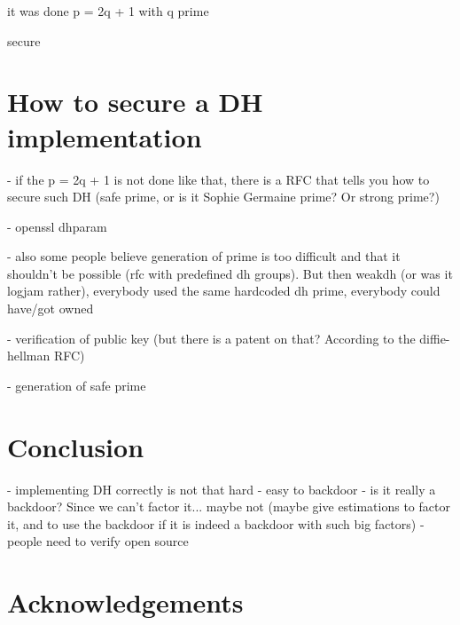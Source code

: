 \documentclass[a4paper,11pt]{article}
\begin{document}
it was done p = 2q + 1 with q prime

secure

\section{How to secure a DH implementation}

- if the p = 2q + 1 is not done like that, there is a RFC that tells you how to secure such DH (safe prime, or is it Sophie Germaine prime? Or strong prime?)

- openssl dhparam

- also some people believe generation of prime is too difficult and that it shouldn't be possible (rfc with predefined dh groups). But then weakdh (or was it logjam rather), everybody used the same hardcoded dh prime, everybody could have/got owned

- verification of public key (but there is a patent on that? According to the diffie-hellman RFC)

- generation of safe prime

\section{Conclusion}

- implementing DH correctly is not that hard
- easy to backdoor
- is it really a backdoor? Since we can't factor it... maybe not (maybe give estimations to factor it, and to use the backdoor if it is indeed a backdoor with such big factors)
- people need to verify open source

\newpage

\section*{Acknowledgements}


\newpage
\end{document}
